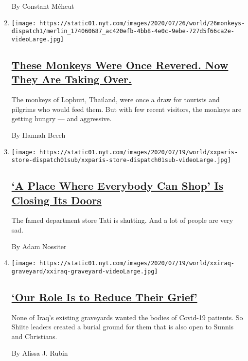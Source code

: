 \begin{enumerate}
  By Constant Méheut
\item
  \texttt{[image: https://static01.nyt.com/images/2020/07/26/world/26monkeys-dispatch1/merlin\_174060687\_ac420efb-4bb8-4e0c-9ebe-727d5f66ca2e-videoLarge.jpg]}

  \hypertarget{these-monkeys-were-once-revered-now-they-are-taking-over}{%
  \subsection{\texorpdfstring{\href{/2020/07/25/world/asia/thailand-monkeys.html}{These
  Monkeys Were Once Revered. Now They Are Taking
  Over.}}{These Monkeys Were Once Revered. Now They Are Taking Over.}}\label{these-monkeys-were-once-revered-now-they-are-taking-over}}

  The monkeys of Lopburi, Thailand, were once a draw for tourists and
  pilgrims who would feed them. But with few recent visitors, the
  monkeys are getting hungry --- and aggressive.

  By Hannah Beech
\item
  \texttt{[image: https://static01.nyt.com/images/2020/07/19/world/xxparis-store-dispatch01sub/xxparis-store-dispatch01sub-videoLarge.jpg]}

  \hypertarget{a-place-where-everybody-can-shop-is-closing-its-doors}{%
  \subsection{\texorpdfstring{\href{/2020/07/20/world/europe/france-paris-tati-coronavirus.html}{`A
  Place Where Everybody Can Shop' Is Closing Its
  Doors}}{`A Place Where Everybody Can Shop' Is Closing Its Doors}}\label{a-place-where-everybody-can-shop-is-closing-its-doors}}

  The famed department store Tati is shutting. And a lot of people are
  very sad.

  By Adam Nossiter
\item
  \texttt{[image: https://static01.nyt.com/images/2020/07/19/world/xxiraq-graveyard/xxiraq-graveyard-videoLarge.jpg]}

  \hypertarget{our-role-is-to-reduce-their-grief}{%
  \subsection{\texorpdfstring{\href{/2020/07/18/world/middleeast/iraq-coronovirus-cemetery.html}{`Our
  Role Is to Reduce Their
  Grief'}}{`Our Role Is to Reduce Their Grief'}}\label{our-role-is-to-reduce-their-grief}}

  None of Iraq's existing graveyards wanted the bodies of Covid-19
  patients. So Shiite leaders created a burial ground for them that is
  also open to Sunnis and Christians.

  By Alissa J. Rubin
\end{enumerate}

